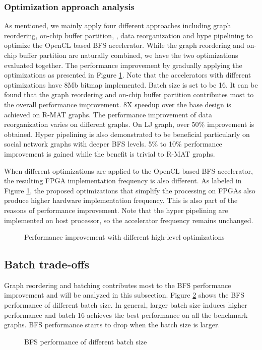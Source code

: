 \subsubsection{Optimization approach analysis}
As mentioned, we mainly apply four different approaches including graph reordering, on-chip buffer partition,  
, data reorganization and hype pipelining to optimize the OpenCL based BFS accelerator.
While the graph reordering and on-chip buffer partition are naturally combined, 
we have the two optimizations evaluated together. The performance improvement 
by gradually applying the optimizations as presented in Figure \ref{fig:opt-analysis}.
Note that the accelerators with different optimizations have 8Mb bitmap implemented.
Batch size is set to be 16.
It can be found that the graph reordering and on-chip buffer partition contributes most to the overall 
performance improvement. 8X speedup over the base design is achieved on R-MAT graphs. 
The performance improvement of data reorganization varies on different graphs. 
On LJ graph, over 50\% improvement is obtained. Hyper pipelining is also demonstrated to be 
beneficial particularly on social network graphs with deeper BFS levels. 5\% to 10\% performance 
improvement is gained while the benefit is trivial to R-MAT graphs.
 
When different optimizations are applied to the OpenCL based BFS accelerator, 
the resulting FPGA implementation frequency is also different. As labeled in 
Figure \ref{fig:opt-analysis}, the proposed optimizations that simplify the 
processing on FPGAs also produce higher hardware implementation frequency.
This is also part of the reasons of performance improvement. Note that the 
hyper pipelining are implemented on host processor, so the accelerator frequency 
remains unchanged.

\begin{figure}
	\caption{Performance improvement with different high-level optimizations}
\label{fig:opt-analysis}
\vspace{-1em}
\end{figure}

\subsection{Batch trade-offs}
Graph reordering and batching contributes most to the BFS performance 
improvement and will be analyzed in this subsection. 
Figure \ref{fig:batch-perf} shows the BFS performance of different batch size.
In general, larger batch size induces higher performance and batch 16 
achieves the best performance on all the benchmark graphs. BFS performance 
starts to drop when the batch size is larger.  
\begin{figure}
    \caption{BFS performance of different batch size}
\label{fig:batch-perf}
\vspace{-1em}
\end{figure}


